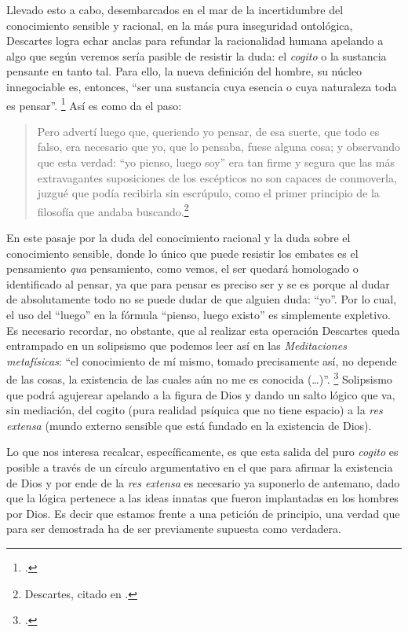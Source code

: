 Llevado esto a cabo, desembarcados en el mar de la incertidumbre del conocimiento sensible y racional, en la más pura inseguridad ontológica, Descartes logra echar anclas para refundar la racionalidad humana apelando a algo que según veremos sería pasible de resistir la duda: el \emph{cogito} o la sustancia pensante en tanto tal. Para ello, la nueva definición del hombre, su núcleo innegociable es, entonces, \enquote{ser una sustancia cuya esencia o cuya naturaleza toda es pensar}. \footcite[][173]{@7116-DESCARTES1941} Así es como da el paso:

\begin{quote}
Pero advertí luego que, queriendo yo pensar, de esa suerte, que todo es falso, era necesario que yo, que lo pensaba, fuese alguna cosa; y observando que esta verdad: \enquote{yo pienso, luego soy} era tan firme y segura que las más extravagantes suposiciones de los escépticos no son capaces de conmoverla, juzgué que podía recibirla sin escrúpulo, como el primer principio de la filosofía que andaba buscando.\footnote{Descartes, citado en \cite[][171]{@7114-CARPIO1980}.}
\end{quote}

En este pasaje por la duda del conocimiento racional y la duda sobre el conocimiento sensible, donde lo único que puede resistir los embates es el pensamiento \emph{qua} pensamiento, como vemos, el ser quedará homologado o identificado al pensar, ya que para pensar es preciso ser y se es porque al dudar de absolutamente todo no se puede dudar de que alguien duda: \enquote{yo}. Por lo cual, el uso del \enquote{luego} en la fórmula \enquote{pienso, luego existo} es simplemente expletivo. Es necesario recordar, no obstante, que al realizar esta operación Descartes queda entrampado en un solipsismo que podemos leer así en las \emph{Meditaciones metafísicas}: \enquote{el conocimiento de mí mismo, tomado precisamente así, no depende de las cosas, la existencia de las cuales aún no me es conocida (\ldots)}. \footcite[][123]{@7116-DESCARTES1941} Solipsismo que podrá agujerear apelando a la figura de Dios y dando un salto lógico que va, sin mediación, del cogito (pura realidad psíquica que no tiene espacio) a la \emph{res extensa} (mundo externo sensible que está fundado en la existencia de Dios).

Lo que nos interesa recalcar, específicamente, es que esta salida del puro \textit{cogito} es posible a través de un círculo argumentativo en el que para afirmar la existencia de Dios y por ende de la \emph{res extensa} es necesario ya suponerlo de antemano, dado que la lógica  pertenece a las ideas innatas que fueron implantadas en los hombres por Dios. Es decir que estamos frente a una petición de principio, una verdad que para ser demostrada ha de ser previamente supuesta como verdadera.

